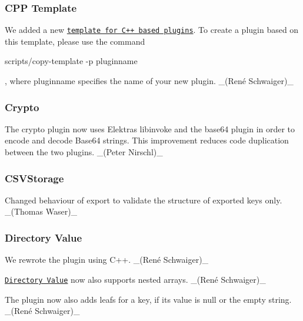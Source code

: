 \subsubsection*{C\+PP Template}


\begin{DoxyItemize}
\item We added a new \href{https://www.libelektra.org/plugins/cpptemplate}{\tt template for C++ based plugins}. To create a plugin based on this template, please use the command
\end{DoxyItemize}


\begin{DoxyCode}
scripts/copy-template -p pluginname
\end{DoxyCode}


, where {\ttfamily pluginname} specifies the name of your new plugin. \+\_\+(René Schwaiger)\+\_\+

\subsubsection*{Crypto}


\begin{DoxyItemize}
\item The {\ttfamily crypto} plugin now uses Elektra\textquotesingle{}s {\ttfamily libinvoke} and the {\ttfamily base64} plugin in order to encode and decode Base64 strings. This improvement reduces code duplication between the two plugins. \+\_\+(\+Peter Nirschl)\+\_\+
\end{DoxyItemize}

\subsubsection*{C\+S\+V\+Storage}


\begin{DoxyItemize}
\item Changed behaviour of export to validate the structure of exported keys only. \+\_\+(\+Thomas Waser)\+\_\+
\end{DoxyItemize}

\subsubsection*{Directory Value}


\begin{DoxyItemize}
\item We rewrote the plugin using C++. \+\_\+(René Schwaiger)\+\_\+
\item \href{https://www.libelektra.org/plugins/directoryvalue}{\tt Directory Value} now also supports nested arrays. \+\_\+(René Schwaiger)\+\_\+
\item The plugin now also adds leafs for a key, if its value is null or the empty string. \+\_\+(René Schwaiger)\+\_\+
\end{DoxyItemize}

